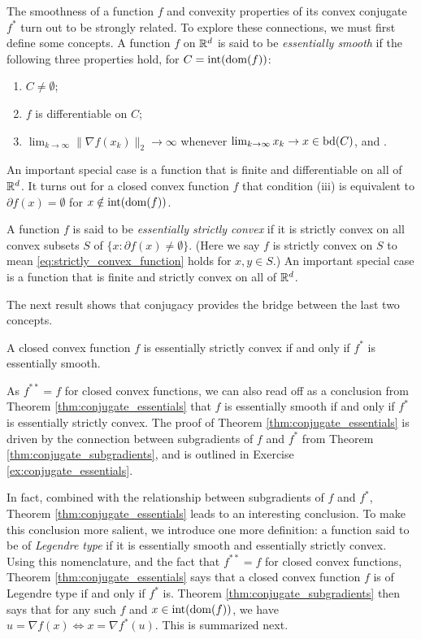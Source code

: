 The smoothness of a function $f$ and convexity properties of its convex
conjugate $f^*$ turn out to be strongly related. To explore these connections,
we must first define some concepts. A function $f$ on $\mathbb{R}^d$ is said to be
\emph{essentially smooth} if the following three properties hold, for $C =
\operatorname{int}(\operatorname{dom}(f))$:    
\begin{enumerate}[label=(\roman*)]
\item $C \not= \emptyset$;
\item $f$ is differentiable on $C$;
\item $\lim_{k \to \infty} \|\nabla f(x_k)\|_2 \to \infty$ whenever $\lim_{k \to
    \infty} x_k \to x \in \operatorname{bd}(C)$, and . 
\end{enumerate}
An important special case is a function that is finite and differentiable on all
of $\mathbb{R}^d$. It turns out for a closed convex function $f$ that condition (iii)
is equivalent to $\partial f(x) = \emptyset$ for $x \notin \operatorname{int}(\operatorname{dom}(f))$.   

A function $f$ is said to be \emph{essentially strictly convex} if it is
strictly convex on all convex subsets $S$ of $ \{x : \partial f(x) \not=
\emptyset\}$. (Here we say $f$ is strictly convex on $S$ to mean
\eqref{eq:strictly_convex_function} holds for $x,y \in S$.) An important special 
case is a function that is finite and strictly convex on all of $\mathbb{R}^d$. 

The next result shows that conjugacy provides the bridge between the last two
concepts.  

\begin{Theorem}
\label{thm:conjugate_essentials}
A closed convex function $f$ is essentially strictly convex if and only if $f^*$
is essentially smooth. 
\end{Theorem}


As $f^{**} = f$ for closed convex functions, we can also read off as a
conclusion from Theorem \ref{thm:conjugate_essentials} that $f$ is essentially
smooth if and only if $f^*$ is essentially strictly convex. The proof of Theorem 
\ref{thm:conjugate_essentials} is driven by the connection between subgradients
of $f$ and $f^*$ from Theorem \ref{thm:conjugate_subgradients}, and is outlined
in Exercise \ref{ex:conjugate_essentials}.

In fact, combined with the relationship between subgradients of $f$ and $f^*$,
Theorem \ref{thm:conjugate_essentials} leads to an interesting conclusion. To
make this conclusion more salient, we introduce one more definition: a function
said to be of \emph{Legendre type} if it is essentially smooth and essentially
strictly convex. Using this nomenclature, and the fact that $f^{**} = f$ for
closed convex functions, Theorem \ref{thm:conjugate_essentials} says that a
closed convex function $f$ is of Legendre type if and only if $f^*$ is. Theorem
\ref{thm:conjugate_subgradients} then says that for any such $f$ and $x \in
\operatorname{int}(\operatorname{dom}(f))$, we have $u = \nabla f(x) \iff x = \nabla f^*(u)$. This is   
summarized next. 

